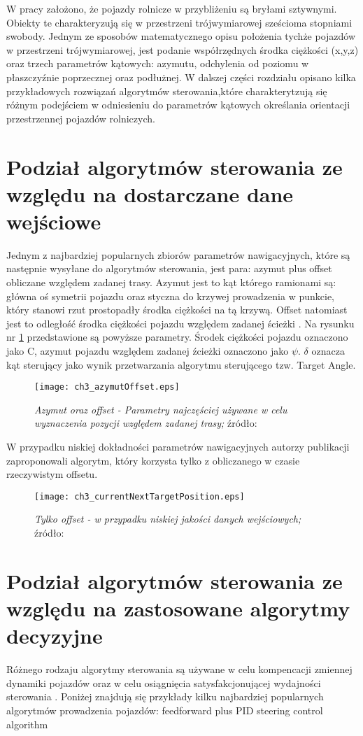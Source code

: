 W pracy założono, że pojazdy rolnicze w przybliżeniu są bryłami sztywnymi.
Obiekty te charakteryzują się w przestrzeni trójwymiarowej sześcioma stopniami swobody.
Jednym ze sposobów matematycznego opisu położenia tychże pojazdów w przestrzeni trójwymiarowej,
jest podanie współrzędnych środka ciężkości (x,y,z) oraz trzech parametrów kątowych: azymutu, odchylenia od poziomu w płaszczyźnie poprzecznej oraz podłużnej.
W dalszej części rozdziału opisano kilka przykładowych rozwiązań algorytmów sterowania,które charakterytzują się różnym podejściem 
w odniesieniu do parametrów kątowych określania orientacji przestrzennej pojazdów rolniczych. 
\section{Podział algorytmów sterowania ze względu na dostarczane dane wejściowe}
Jednym z najbardziej popularnych zbiorów parametrów nawigacyjnych, które są następnie wysyłane do algorytmów sterowania, jest para:
azymut plus offset obliczane względem zadanej trasy. Azymut jest to kąt którego ramionami są:
główna oś symetrii pojazdu oraz styczna do krzywej prowadzenia w punkcie, który stanowi rzut prostopadły środka ciężkości na tą krzywą.
Offset natomiast jest to odległość środka ciężkości pojazdu względem zadanej ścieżki \cite{CCTA_769_775}.
Na rysunku nr \ref{fig:ch3_azymutOffset} przedstawione są powyższe parametry. Środek ciężkości pojazdu oznaczono jako C,
azymut pojazdu względem zadanej źcieżki oznaczono jako $\psi$. $\delta$ oznacza kąt sterujący jako wynik przetwarzania algorytmu sterującego tzw. Target Angle.    
\begin{figure}[H] 
\centering
\texttt{[image: ch3\_azymutOffset.eps]}
\caption{\textit{Azymut oraz offset - Parametry najczęściej używane w celu wyznaczenia pozycji względem zadanej trasy;}
źródło: \cite[][strona 464]{CCTA5_461_469}}
\label{fig:ch3_azymutOffset}
\end{figure}

W przypadku niskiej dokładności parametrów nawigacyjnych autorzy publikacji \cite{CCTA_943_950}
zaproponowali algorytm, który korzysta tylko z obliczanego w czasie rzeczywistym offsetu.
\begin{figure}[H]
\centering
\texttt{[image: ch3\_currentNextTargetPosition.eps]}
\caption{\textit{Tylko offset - w przypadku niskiej jakości danych wejściowych;} 
	źródło: \cite[][strona 947]{CCTA_943_950}}
\label{fig:ch3_currentNextTargetPosition}
\end{figure}

\section{Podział algorytmów sterowania ze względu na zastosowane algorytmy decyzyjne}
Różnego rodzaju algorytmy sterowania są używane w celu kompencacji zmiennej dynamiki pojazdów oraz w celu osiągnięcia satysfakcjonującej wydajności sterowania
 \cite[][strona 770]{CCTA_769_775}. Poniżej znajdują się przykłady kilku najbardziej popularnych algorytmów prowadzenia pojazdów:
feedforward plus PID steering control algorithm
